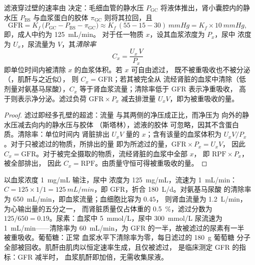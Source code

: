 \begin{theorem}[滤过与清除率]\label{thm:b3:renal-osmoregulation:clearance}
滤液穿过壁的速率由
\emph{}决定：毛细血管的静水压
$P_{\text{GC}}$ 将液体推出，肾小囊腔内的静水压
$P_{\text{BS}}$ 与血浆蛋白的胶体
$\pi_{\text{GC}}$ 则将其拉回，且
\[
\text{GFR} = K_{f}\,\bigl(P_{\text{GC}} - P_{\text{BS}} - \pi_{\text{GC}}\bigr)
\approx K_{f}\,(55 - 15 - 30)\ \unit{mmHg} = K_{f}\times \qty{10}{mmHg},
\]
即\emph{}，成人中约为 \qty{125}{mL/min}。
对于任一物质 $x$，设其血浆浓度为 $P_{x}$，尿中
浓度为 $U_{x}$，尿流量为 $V$，其\emph{清除率}
\[
C_{x} = \frac{U_{x}\,V}{P_{x}}
\]
即单位时间内被清除 $x$ 的血浆体积。若 $x$ 可自由滤过，
既不被重吸收也不被分泌（，肌酐与之近似），
则 $C_{x} = \text{GFR}$；若其被完全从
流经肾脏的血浆中清除（低剂量对氨基马尿酸），$C_{x}$
等于肾血浆流量；清除率低于 GFR 表示净重吸收，
高于则表示净分泌。滤过负荷 $\text{GFR}
\times P_{x}$ 减去排泄量 $U_{x}V$，即为被重吸收的量。
\end{theorem}
\begin{proof}
滤过即经多孔壁的超滤：流量
与其两侧的净压成正比，而净压为
向外的静水压减去向内的静水压与胶体
（斯塔林），滤液的胶体
可忽略，因其不含蛋白质。清除率：单位时间内
肾脏排出 $U_{x}V$ 量的 $x$；含有该量的血浆体积为
$U_{x}V/P_{x}$。对于只被滤过的物质，所排出的量
即为所滤过的量，$\text{GFR}\times P_{x} = U_{x}V$，
因此 $C_{x} = \text{GFR}$。对于被完全摄取的物质，流经肾脏的血浆中全部 $x$，
即 $\text{RPF}\times P_{x}$，被全部排出，
因此 $C_{x} = \text{RPF}$。由质量守恒可得被重吸收的量。
\end{proof}

\begin{example}[清除率的数值例子]\label{ex:b3:renal-osmoregulation:numbers}
以血浆浓度 \qty{1}{mg/mL} 输注，尿中
浓度为 \qty{125}{mg/mL}，流速为 \qty{1}{mL/min}：$C = 125\times 1/1 =
\qty{125}{mL/min}$，即 GFR，折合 \qty{180}{L/d}。对氨基马尿酸
的清除率为 \qty{650}{mL/min}，即血浆流量；血细胞比容为 $0.45$，
则肾血流量为 \qty{1.2}{L/min}，为心输出量的五分之一，
而肾脏质量仅占体重的 \qty{0.5}{\%}，滤过分数为
$125/650 = 0.19$。尿素：血浆中 \qty{5}{mmol/L}，尿中 \qty{300}{mmol/L}
尿流速为 \qty{1}{mL/min}——清除率为 \qty{60}{mL/min}，为 GFR 的一半，故被滤过的尿素有一半
被重吸收。葡萄糖：正常
血浆水平下清除率为零，每日滤过的 \qty{180}{g} 葡萄糖
分子全部被回收。肌酐由肌肉以恒定速率生成，且仅被滤过，
是临床测定 GFR 的指标：GFR 减半时，
血浆肌酐即加倍，无需收集尿液。
\end{example}

